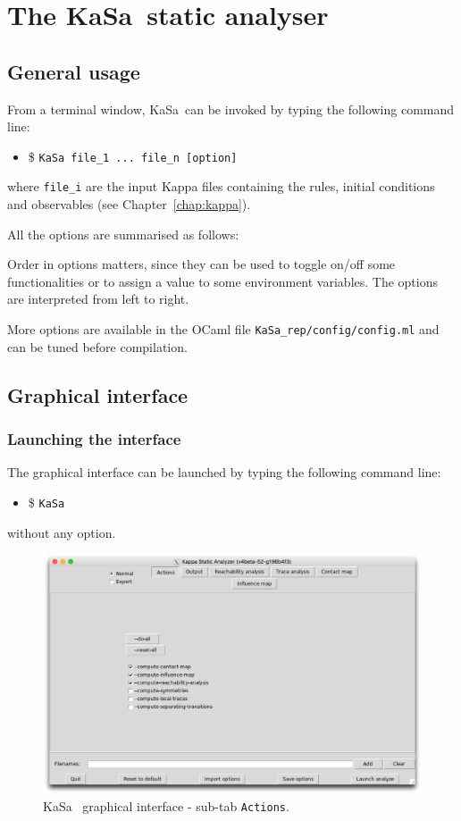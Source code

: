 \documentclass[11pt]{book}
\def\KaSa{\textsf{KaSa}}
\def\ttt#1{\texttt{#1}}
\def\ITE#1{\begin{itemize}#1\end{itemize}}
\begin{document}
\chapter{The \KaSa~static analyser}

\section{General usage}

From a terminal window, \KaSa~can be invoked by typing the following command line:
\ITE{
\item[\$] \ttt{KaSa file\_1 ... file\_n  [option]}
}
where \ttt{file\_i} are the input Kappa files containing the rules, initial conditions and observables (see Chapter~\ref{chap:kappa}).

All the options are summarised as follows:


Order in options matters, since they can be used to toggle on/off some functionalities or to assign a value to some environment variables.
The options are interpreted from left to right.

More options are available in the OCaml file \texttt{KaSa\_rep/config/config.ml} and can be tuned before compilation.

\section{Graphical interface}

\subsection{Launching the interface}

The graphical interface can be launched by typing the following command line:
\ITE{\item[\$] \ttt{KaSa}}

without any option.

\begin{figure}[htbp]
\centering
\includegraphics[width=12cm,bb=0 0 1904 1208]{img/kasa_0.png}
\caption{\KaSa~ graphical interface - sub-tab \texttt{Actions}.}
\label{fig:kasa:0}
\end{figure}
\end{document}
